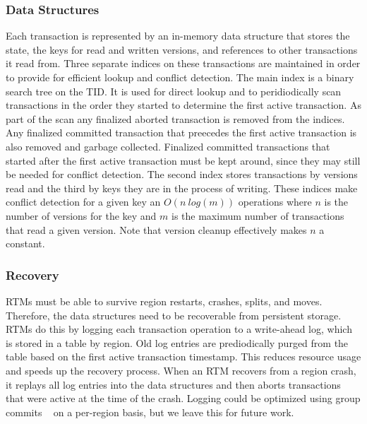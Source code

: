 \documentclass[10pt,final,journal]{IEEEtran}
\begin{document}
\subsubsection{Data Structures}
Each transaction is represented by an in-memory data structure that stores the state, the keys for read and written versions, and references to other transactions it read from. Three separate indices on these transactions are maintained in order to provide for efficient lookup and conflict detection. The main index is a binary search tree on the TID. It is used for direct lookup and to peridiodically scan transactions in the order they started to determine the first active transaction. As part of the scan any finalized aborted transaction is removed from the indices. Any finalized committed transaction that preecedes the first active transaction is also removed and garbage collected. Finalized committed transactions that started after the first active transaction must be kept around, since they may still be needed for conflict detection. The second index stores transactions by versions read and the third by keys they are in the process of writing. These indices make conflict detection for a given key an $O(n \: log(m))$ operations where $n$ is the number of versions for the key and $m$ is the maximum number of transactions that read a given version. Note that version cleanup effectively makes $n$ a constant.

\subsubsection{Recovery}
RTMs must be able to survive region restarts, crashes, splits, and moves. Therefore, the data structures need to be recoverable from persistent storage. RTMs do this by logging each transaction operation to a write-ahead log, which is stored in a table by region. Old log entries are prediodically purged from the table based on the first active transaction timestamp. This reduces resource usage and speeds up the recovery process. When an RTM recovers from a region crash, it replays all log entries into the data structures and then aborts transactions that were active at the time of the crash. Logging could be optimized using group commits ~\cite{Weikum:2001:TIS} on a per-region basis, but we leave this for future work.
\end{document}
